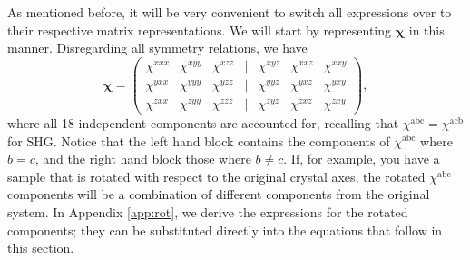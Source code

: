 \documentclass[aps,pra,10pt,amsmath,twocolumn,letterpaper]{revtex4-1}
\begin{document}
As mentioned before, it will be very convenient to switch all expressions over
to their respective matrix representations. We will start by representing
$\boldsymbol{\chi}$ in this manner. Disregarding all symmetry relations, we have
\begin{equation}\label{eq:chicomplete}
\boldsymbol{\chi} =
\begin{pmatrix}
\chi^{xxx}&\chi^{xyy}&\chi^{xzz} &|& \chi^{xyz}&\chi^{xxz}&\chi^{xxy} \\[3pt]
\chi^{yxx}&\chi^{yyy}&\chi^{yzz} &|& \chi^{yyz}&\chi^{yxz}&\chi^{yxy} \\[3pt]
\chi^{zxx}&\chi^{zyy}&\chi^{zzz} &|& \chi^{zyz}&\chi^{zxz}&\chi^{zxy}
\end{pmatrix}
,
\end{equation}
where all 18 independent components are accounted for, recalling that
$\chi^{\mathrm{abc}} = \chi^{\mathrm{acb}}$ for SHG. Notice that the left hand
block contains the components of $\chi^{\mathrm{abc}}$ where $b = c$, and the
right hand block those where $b \neq c$. If, for example, you have a sample that
is rotated with respect to the original crystal axes, the rotated
$\chi^{\mathrm{abc}}$ components will be a combination of different components
from the original system. In Appendix \ref{app:rot}, we derive the expressions
for the rotated components; they can be substituted directly into the equations
that follow in this section.
\end{document}
